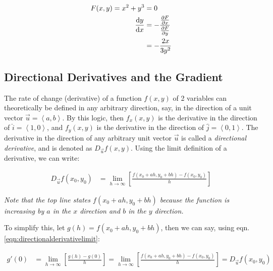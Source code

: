\documentclass[12pt]{article}
\begin{document}
\begin{equation}
    \begin{split}
        F(x,y) = x^2 + y^3 &= 0\\
        \frac{\text{d}y}{\text{d}x} &= -\frac{\frac{\partial F}{\partial x}}{\frac{\partial F}{\partial y}}\\
        &= -\frac{2x}{3y^2}\\
    \end{split}
\end{equation}
\subsection{Directional Derivatives and the Gradient}

The rate of change (derivative) of a function $f(x,y)$ of 2 variables can theoretically be defined in any arbitrary direction, say, in the direction of a unit vector $\vec{u} = \left\langle a,b\right\rangle$. By this logic, then $f_x(x,y)$ is the derivative in the direction of $\hat{i} = \left\langle 1, 0 \right\rangle$, and $f_y(x,y)$ is the derivative in the direction of $\hat{j} = \left\langle 0, 1 \right\rangle$. The derivative in the direction of any arbitrary unit vector $\vec{u}$ is called a \textit{directional derivative}, and is denoted as $D_{\vec{u}}f(x,y)$. Using the limit definition of a derivative, we can write:

\begin{equation}\label{eqn:directionalderivativelimit}
    \begin{split}
        D_{\vec{u}}f(x_0,y_0) &= \lim_{h\to\infty}[\frac{f(x_0+ah,y_0+bh)-f(x_0,y_0)}{h}]
    \end{split}
\end{equation}

\textit{Note that the top line states $f(x_0+ah,y_0+bh)$ because the function is increasing by $a$ in the $x$ direction and $b$ in the $y$ direction.}

To simplify this, let $g(h) = f(x_0+ah,y_0+bh)$, then we can say, using eqn. \ref{eqn:directionalderivativelimit}:

\begin{equation}
    \begin{split}
        g'(0) &= \lim_{h\to\infty}[\frac{g(h)-g(0)}{h}] = \lim_{h\to\infty}[\frac{f(x_0+ah,y_0+bh)-f(x_0,y_0)}{h}] = D_{\vec{u}}f(x_0,y_0)\\
    \end{split}
\end{equation}
\end{document}
